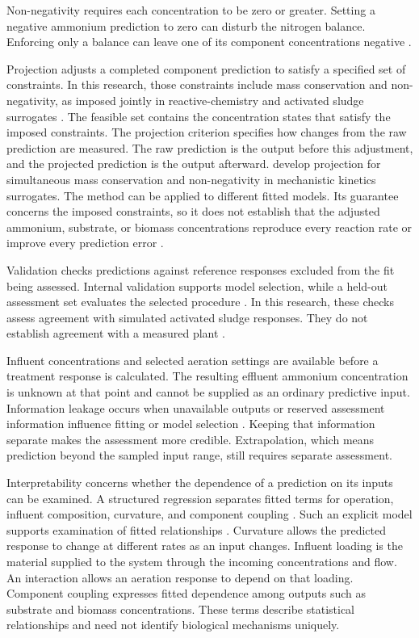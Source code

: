 Non-negativity requires each concentration to be zero or greater. Setting a negative ammonium prediction to zero can disturb the nitrogen balance. Enforcing only a balance can leave one of its component concentrations negative \citep{Harder2022,KircherVotsmeier2025}.

Projection adjusts a completed component prediction to satisfy a specified set of constraints. In this research, those constraints include mass conservation and non-negativity, as imposed jointly in reactive-chemistry and activated sludge surrogates \citep{KircherVotsmeier2025,Selerio2026}. The feasible set contains the concentration states that satisfy the imposed constraints. The projection criterion specifies how changes from the raw prediction are measured. The raw prediction is the output before this adjustment, and the projected prediction is the output afterward. \citet{KircherVotsmeier2025} develop projection for simultaneous mass conservation and non-negativity in mechanistic kinetics surrogates. The method can be applied to different fitted models. Its guarantee concerns the imposed constraints, so it does not establish that the adjusted ammonium, substrate, or biomass concentrations reproduce every reaction rate or improve every prediction error \citep{SturmSilva2024,Selerio2026}.

Validation checks predictions against reference responses excluded from the fit being assessed. Internal validation supports model selection, while a held-out assessment set evaluates the selected procedure \citep{Hastie2009,Kaufman2012}. In this research, these checks assess agreement with simulated activated sludge responses. They do not establish agreement with a measured plant \citep{Machado2014,Newhart2019}.

Influent concentrations and selected aeration settings are available before a treatment response is calculated. The resulting effluent ammonium concentration is unknown at that point and cannot be supplied as an ordinary predictive input. Information leakage occurs when unavailable outputs or reserved assessment information influence fitting or model selection \citep{Kaufman2012,Newhart2019}. Keeping that information separate makes the assessment more credible. Extrapolation, which means prediction beyond the sampled input range, still requires separate assessment.

Interpretability concerns whether the dependence of a prediction on its inputs can be examined. A structured regression separates fitted terms for operation, influent composition, curvature, and component coupling \citep{Selerio2026}. Such an explicit model supports examination of fitted relationships \citep{Rudin2019,Brunton2016}. Curvature allows the predicted response to change at different rates as an input changes. Influent loading is the material supplied to the system through the incoming concentrations and flow. An interaction allows an aeration response to depend on that loading. Component coupling expresses fitted dependence among outputs such as substrate and biomass concentrations. These terms describe statistical relationships and need not identify biological mechanisms uniquely.

